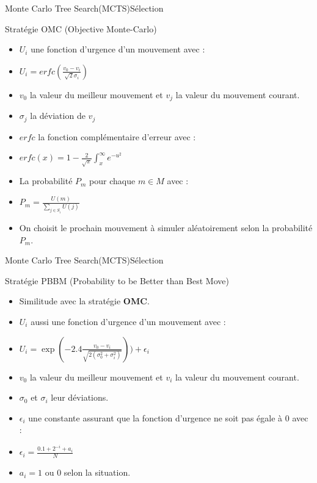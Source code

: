 \begin{frame}{Monte Carlo Tree Search(MCTS)}{Sélection}
	\begin{block}{Stratégie OMC (Objective Monte-Carlo)}
		\begin{itemize}
			\item ${U_{i}}$ une fonction d'urgence d'un mouvement avec :
			\item $U_{i} = erfc(\frac{v_{0} - v_{i}}{\sqrt{2}\sigma_{i}})$
			\item $v_{0}$ la valeur du meilleur mouvement et $v_{j}$ la valeur du mouvement courant.
			\item $\sigma_{j}$ la déviation de $v_{j}$
			\item $erfc$ la fonction complémentaire d'erreur avec :
			\item $erfc(x) = 1 - \frac{2}{\sqrt{\pi}}\int_{x}^{\infty}e^{-u^{2}}$
			\item La probabilité $P_{m}$ pour chaque $m \in M$ avec :
			\item $P_{m} = \frac{U(m)}{\sum_{j \in S_{i}}^{}U(j)}$
			\item On choisit le prochain mouvement à simuler aléatoirement selon la probabilité $P_{m}$.
		\end{itemize}
	\end{block}
\end{frame}

\begin{frame}{Monte Carlo Tree Search(MCTS)}{Sélection}
	\begin{block}{Stratégie PBBM (Probability to be Better than Best Move)}
		\begin{itemize}
			\item Similitude avec la stratégie \textbf{OMC}.
			\item $U_{i}$ aussi une fonction d'urgence d'un mouvement avec :
			\item $U_{i} = \exp(-2.4\frac{v_{0} - v_{i}}{\sqrt{2(\sigma_{0}^2 + \sigma_{i}^2)}})) + \epsilon_{i}$
			\item $v_{0}$ la valeur du meilleur mouvement et $v_{i}$ la valeur du mouvement courant.
			\item $\sigma_{0}$ et $\sigma_{i}$ leur déviations.
			\item $\epsilon_ {i}$ une constante assurant que la fonction d'urgence ne soit pas égale à 0 avec :
			\item $\epsilon_ {i} = \frac{0.1 + 2^{-i} + a_{i}}{N}$
			\item $a_{i} = 1$ ou $0$ selon la situation.
		\end{itemize}
	\end{block}
\end{frame}


